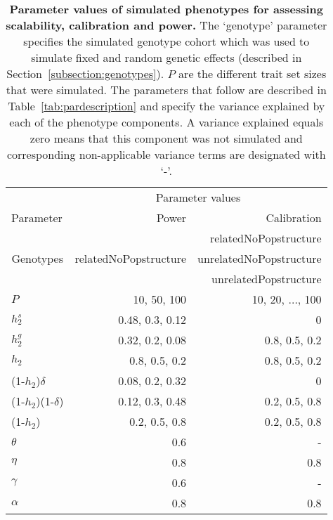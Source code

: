 \begin{table}[htbp]
  \centering
  \caption{\textbf{Parameter values of simulated phenotypes for assessing scalability, calibration and power.} The `genotype' parameter specifies the simulated genotype cohort which was used to simulate fixed and random genetic effects (described in Section~\ref{subsection:genotypes}). \(P\) are the different trait set sizes that were simulated. The parameters that follow are described in Table~\ref{tab:pardescription} and specify the variance explained by each of the phenotype components. A variance explained equals zero means that this component was not simulated and corresponding non-applicable variance terms are designated with `-'.} 
    \begin{tabular}{lrr}
    \toprule
          & \multicolumn{2}{c}{Parameter values} \\
\cmidrule{2-3}    Parameter & Power  & Calibration \\
    \midrule
    \multicolumn{1}{c}{\multirow{3}[1]{*}{Genotypes}} & \multicolumn{1}{c}{\multirow{3}[1]{*}{relatedNoPopstructure}} & relatedNoPopstructure \\
          &       & unrelatedNoPopstructure \\
          &       & unrelatedPopstructure \\
          \addlinespace[1.5ex]
    \(P\) & 10, 50, 100 & 10, 20, \(\ldots\), 100 \\
   \addlinespace[1.5ex]
    \(h_2^s\) & 0.48, 0.3, 0.12 & 0 \\
    \(h_2^g\) & 0.32, 0.2, 0.08 & 0.8, 0.5, 0.2 \\
    \(h_2\) & 0.8, 0.5, 0.2 & 0.8, 0.5, 0.2 \\
    (1-\(h_2\))\(\delta\) & 0.08, 0.2, 0.32 & 0 \\
    (1-\(h_2\))(1-\(\delta\)) & 0.12, 0.3, 0.48 & 0.2, 0.5, 0.8 \\
    (1-\(h_2\)) & 0.2, 0.5, 0.8 & 0.2, 0.5, 0.8 \\
    \(\theta\) & 0.6   &  - \\
    \(\eta\) & 0.8   & 0.8 \\
    \(\gamma\) & 0.6   &  - \\
    \(\alpha\) & 0.8   & 0.8 \\
    \bottomrule
    \end{tabular}%
\label{tab:parvalues}%
\end{table}%

